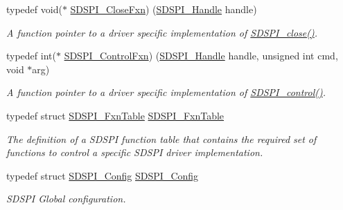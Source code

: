 \begin{DoxyCompactItemize}
typedef void($\ast$ \hyperlink{_s_d_s_p_i_8h_a93cc6dafba2c319c8f2662c9e109f0cd}{S\+D\+S\+P\+I\+\_\+\+Close\+Fxn}) (\hyperlink{_s_d_s_p_i_8h_abd3d22133d60c2e5afd49722d6bafb7e}{S\+D\+S\+P\+I\+\_\+\+Handle} handle)
\begin{DoxyCompactList}\small\item\em A function pointer to a driver specific implementation of \hyperlink{_s_d_s_p_i_8h_a8816c223935b575f10acd5277b9a8ca5}{S\+D\+S\+P\+I\+\_\+close()}. \end{DoxyCompactList}\item 
typedef int($\ast$ \hyperlink{_s_d_s_p_i_8h_a0fe214b1dedf57fb70d9c83426a4b135}{S\+D\+S\+P\+I\+\_\+\+Control\+Fxn}) (\hyperlink{_s_d_s_p_i_8h_abd3d22133d60c2e5afd49722d6bafb7e}{S\+D\+S\+P\+I\+\_\+\+Handle} handle, unsigned int cmd, void $\ast$arg)
\begin{DoxyCompactList}\small\item\em A function pointer to a driver specific implementation of \hyperlink{_s_d_s_p_i_8h_a541a1db109382fe090ed7a9209a34f61}{S\+D\+S\+P\+I\+\_\+control()}. \end{DoxyCompactList}\item 
typedef struct \hyperlink{struct_s_d_s_p_i___fxn_table}{S\+D\+S\+P\+I\+\_\+\+Fxn\+Table} \hyperlink{_s_d_s_p_i_8h_a5d2665a5c69ea532a94acdc45ac1f456}{S\+D\+S\+P\+I\+\_\+\+Fxn\+Table}
\begin{DoxyCompactList}\small\item\em The definition of a S\+D\+S\+P\+I function table that contains the required set of functions to control a specific S\+D\+S\+P\+I driver implementation. \end{DoxyCompactList}\item 
typedef struct \hyperlink{struct_s_d_s_p_i___config}{S\+D\+S\+P\+I\+\_\+\+Config} \hyperlink{_s_d_s_p_i_8h_acd04506a18457faefc4f3639b6e0a0a1}{S\+D\+S\+P\+I\+\_\+\+Config}
\begin{DoxyCompactList}\small\item\em S\+D\+S\+P\+I Global configuration. \end{DoxyCompactList}\end{DoxyCompactItemize}
